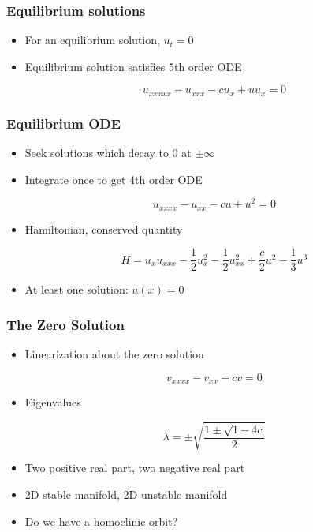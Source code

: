\documentclass[16pt]{beamer}
\begin{document}
\begin{frame}
	\frametitle{Equilibrium solutions}
	\fontsize{18}{7.2}\selectfont
	\begin{itemize}
		\item<1-> For an equilibrium solution, $u_t = 0$

		\vspace{0.5cm}
		\item<2-> Equilibrium solution satisfies 5th order ODE 
		\begin{center}
		\[ u_{xxxxx} - u_{xxx} - c u_x + u u_x = 0 \]
		\end{center}
	\end{itemize}
\end{frame}

\begin{frame}
	\frametitle{Equilibrium ODE}
	\fontsize{16}{7.2}\selectfont
	\begin{itemize}
		\item<1->Seek solutions which decay to 0 at $\pm \infty$
		\vspace{0.5cm}
		\item<2->Integrate once to get 4th order ODE 
		\begin{center}
		\[u_{xxxx} - u_{xx} - cu + u^2 = 0\]
		\end{center}
		\vspace{0.5cm}
		\item<3->Hamiltonian, conserved quantity
		\begin{center}
		\[
		H = u_x u_{xxx} - \frac{1}{2}u_x^2 - \frac{1}{2}u_{xx}^2 + \frac{c}{2}u^2 - \frac{1}{3}u^3
		\]
		\end{center}
		\item<4->At least one solution: $u(x) = 0$
	\end{itemize} 
\end{frame}

\begin{frame}
	\frametitle{The Zero Solution}
	\fontsize{16}{7.2}\selectfont
	\begin{itemize}
		\item<1->Linearization about the zero solution
		\begin{center}
		\[v_{xxxx} - v_{xx} - c v = 0 \]
		\end{center}
		\item<2->Eigenvalues
		\begin{center}
		\[ \lambda = \pm \sqrt{ \frac{1 \pm \sqrt{1 - 4c } }{ 2} } \]
		\end{center}
		\item<3->Two positive real part, two negative real part
		\item<4->2D stable manifold, 2D unstable manifold
		\item<5->Do we have a homoclinic orbit?
	\end{itemize}
\end{frame}
\end{document}
